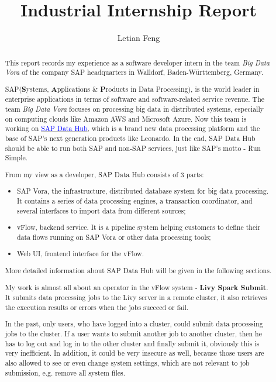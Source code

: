 \documentclass[article,colorback,accentcolor=tud4c]{tudreport}
\title{Industrial Internship Report}
\subtitle{Letian Feng}
\begin{document}
\maketitle
\begin{abstract}

This report records my experience as a software developer intern in the team \textit{Big Data Vora} of the company SAP headquarters in Walldorf, Baden-W{\"u}rttemberg, Germany.

SAP(\textbf{S}ystems, \textbf{A}pplications \& \textbf{P}roducts in Data Processing), is the world leader in enterprise applications in terms of software and software-related service revenue. \cite{sap company information}
The team \textit{Big Data Vora} focuses on processing big data in distributed systems, especially on computing clouds like Amazon AWS and Microsoft Azure. 
Now this team is working on \href{https://www.sap.com/products/data-hub.html}{\textcolor{blue}{SAP Data Hub}}, which is a brand new data processing platform and the base of SAP's next generation products like Leonardo. 
In the end, SAP Data Hub should be able to run both SAP and non-SAP services, just like SAP's motto - Run Simple.

From my view as a developer, SAP Data Hub consists of 3 parts: 
\begin{itemize}\itemsep-\the\parsep
	\item SAP Vora, the infrastructure, distributed database system for big data processing. It contains a series of data processing engines, a transaction coordinator, and several interfaces to import data from different sources;
 	\item vFlow, backend service. It is a pipeline system helping customers to define their data flows running on SAP Vora or other data processing tools;
 	\item Web UI, frontend interface for the vFlow.
\end{itemize}

More detailed information about SAP Data Hub will be given in the following sections.

My work is almost all about an operator in the vFlow system - \textbf{Livy Spark Submit}. It submits data processing jobs to the Livy server in a remote cluster, it also retrieves the execution results or errors when the jobs succeed or fail.

In the past, only users, who have logged into a cluster, could submit data processing jobs to the cluster. If a user wants to submit another job to another cluster, then he has to log out and log in to the other cluster and finally submit it, obviously this is very inefficient. In addition, it could be very insecure as well, because those users are also allowed to see or even change system settings, which are not relevant to job submission, e.g. remove all system files. 


\end{abstract}
\end{document}
